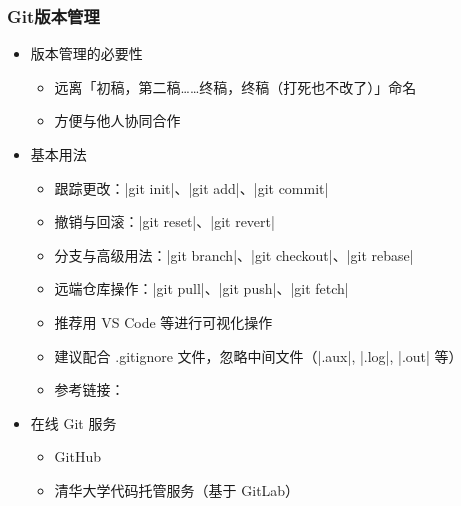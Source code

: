 \begin{frame}[fragile]
  \frametitle{Git版本管理}
  \begin{itemize}
    \item 版本管理的必要性
      \begin{itemize}
        \item 远离「初稿，第二稿……终稿，终稿（打死也不改了）」命名
        \item 方便与他人协同合作
      \end{itemize}
    \item 基本用法
      \begin{itemize}
        \item 跟踪更改：|git init|、|git add|、|git commit|
        \item 撤销与回滚：|git reset|、|git revert|
        \item 分支与高级用法：|git branch|、|git checkout|、|git rebase|
        \item 远端仓库操作：|git pull|、|git push|、|git fetch|
        \item 推荐用 VS Code 等进行可视化操作
        \item 建议配合 .gitignore 文件，忽略中间文件（|.aux|, |.log|, |.out| 等）
        \item 参考链接：
      \end{itemize}
    \item 在线 Git 服务
      \begin{itemize}
        \item GitHub \href{https://github.com}{\faGithub}
        \item 清华大学代码托管服务（基于 GitLab） 
      \end{itemize}
  \end{itemize}
  \end{frame}

